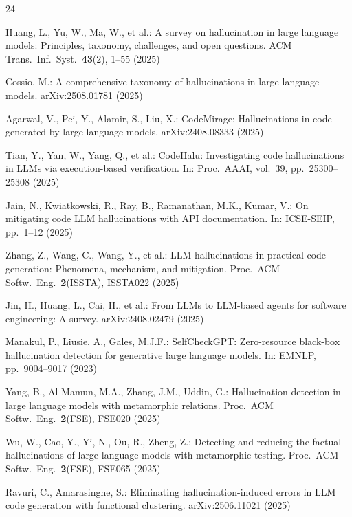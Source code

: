 \documentclass[11pt,a4paper]{article}
\begin{document}
\begin{thebibliography}{24}

Huang, L., Yu, W., Ma, W., et al.: A survey on hallucination in large language models: Principles, taxonomy, challenges, and open questions. ACM Trans.\ Inf.\ Syst.\ \textbf{43}(2), 1--55 (2025)

Cossio, M.: A comprehensive taxonomy of hallucinations in large language models. arXiv:2508.01781 (2025)

Agarwal, V., Pei, Y., Alamir, S., Liu, X.: CodeMirage: Hallucinations in code generated by large language models. arXiv:2408.08333 (2025)

Tian, Y., Yan, W., Yang, Q., et al.: CodeHalu: Investigating code hallucinations in LLMs via execution-based verification. In: Proc.\ AAAI, vol.~39, pp.~25300--25308 (2025)

Jain, N., Kwiatkowski, R., Ray, B., Ramanathan, M.K., Kumar, V.: On mitigating code LLM hallucinations with API documentation. In: ICSE-SEIP, pp.~1--12 (2025)

Zhang, Z., Wang, C., Wang, Y., et al.: LLM hallucinations in practical code generation: Phenomena, mechanism, and mitigation. Proc.\ ACM Softw.\ Eng.\ \textbf{2}(ISSTA), ISSTA022 (2025)

Jin, H., Huang, L., Cai, H., et al.: From LLMs to LLM-based agents for software engineering: A survey. arXiv:2408.02479 (2025)

Manakul, P., Liusie, A., Gales, M.J.F.: SelfCheckGPT: Zero-resource black-box hallucination detection for generative large language models. In: EMNLP, pp.~9004--9017 (2023)

Yang, B., Al Mamun, M.A., Zhang, J.M., Uddin, G.: Hallucination detection in large language models with metamorphic relations. Proc.\ ACM Softw.\ Eng.\ \textbf{2}(FSE), FSE020 (2025)

Wu, W., Cao, Y., Yi, N., Ou, R., Zheng, Z.: Detecting and reducing the factual hallucinations of large language models with metamorphic testing. Proc.\ ACM Softw.\ Eng.\ \textbf{2}(FSE), FSE065 (2025)

Ravuri, C., Amarasinghe, S.: Eliminating hallucination-induced errors in LLM code generation with functional clustering. arXiv:2506.11021 (2025)


\end{thebibliography}
\end{document}
